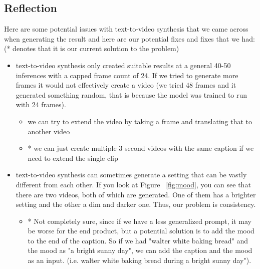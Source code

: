 \documentclass[conference]{IEEEtran}
\begin{document}
\subsection{Reflection}
Here are some potential issues with text-to-video synthesis that we came across when generating the result and here are our potential fixes and fixes that we had:
(* denotes that it is our current solution to the problem)
\begin{itemize}
    \item text-to-video synthesis only created suitable results at a general 40-50 inferences with a capped frame count of 24. If we tried to generate more frames it would not effectively create a video (we tried 48 frames and it generated something random, that is because the model was trained to run with 24 frames). 
    \begin{itemize}
        \item we can try to extend the video by taking a frame and translating that to another video
        \item * we can just create multiple 3 second videos with the same caption if we need to extend the single clip
    \end{itemize}
    \item text-to-video synthesis can sometimes generate a setting that can be vastly different from each other. If you look at Figure ~\ref{fig:mood}, you can see that there are two videos, both of which are generated. One of them has a brighter setting and the other a dim and darker one. Thus, our problem is consistency.
    \begin{itemize}
        \item * Not completely sure, since if we have a less generalized prompt, it may be worse for the end product, but a potential solution is to add the mood to the end of the caption. So if we had "walter white baking bread" and the mood as "a bright sunny day", we can add the caption and the mood as an input. (i.e. walter white baking bread during a bright sunny day").
    \end{itemize}
\end{itemize}
\end{document}
